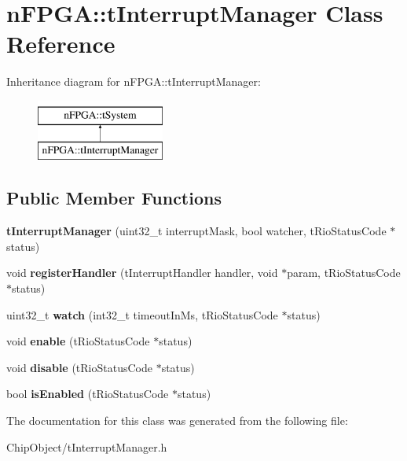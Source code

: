 \hypertarget{classnFPGA_1_1tInterruptManager}{
\section{nFPGA::tInterruptManager Class Reference}
\label{classnFPGA_1_1tInterruptManager}
}
Inheritance diagram for nFPGA::tInterruptManager:\begin{figure}[H]
\begin{center}
\leavevmode
\includegraphics[height=2.000000cm]{classnFPGA_1_1tInterruptManager}
\end{center}
\end{figure}
\subsection*{Public Member Functions}
\begin{DoxyCompactItemize}
\item 
\hypertarget{classnFPGA_1_1tInterruptManager_adf2f47bfd54901bc553d2a3d9f9ae1a7}{
{\bfseries tInterruptManager} (uint32\_\-t interruptMask, bool watcher, tRioStatusCode $\ast$status)}
\label{classnFPGA_1_1tInterruptManager_adf2f47bfd54901bc553d2a3d9f9ae1a7}

\item 
\hypertarget{classnFPGA_1_1tInterruptManager_a692db7281d9179bf3cfe10cd81f6b77b}{
void {\bfseries registerHandler} (tInterruptHandler handler, void $\ast$param, tRioStatusCode $\ast$status)}
\label{classnFPGA_1_1tInterruptManager_a692db7281d9179bf3cfe10cd81f6b77b}

\item 
\hypertarget{classnFPGA_1_1tInterruptManager_a7801ebc3f0fabfacf25d0c176c612528}{
uint32\_\-t {\bfseries watch} (int32\_\-t timeoutInMs, tRioStatusCode $\ast$status)}
\label{classnFPGA_1_1tInterruptManager_a7801ebc3f0fabfacf25d0c176c612528}

\item 
\hypertarget{classnFPGA_1_1tInterruptManager_a2893867e617cfe917653f9e1034d696d}{
void {\bfseries enable} (tRioStatusCode $\ast$status)}
\label{classnFPGA_1_1tInterruptManager_a2893867e617cfe917653f9e1034d696d}

\item 
\hypertarget{classnFPGA_1_1tInterruptManager_a5c3ea6c1f698c074baa02d09060aed8c}{
void {\bfseries disable} (tRioStatusCode $\ast$status)}
\label{classnFPGA_1_1tInterruptManager_a5c3ea6c1f698c074baa02d09060aed8c}

\item 
\hypertarget{classnFPGA_1_1tInterruptManager_afb1264c599d1292f833125993160c45d}{
bool {\bfseries isEnabled} (tRioStatusCode $\ast$status)}
\label{classnFPGA_1_1tInterruptManager_afb1264c599d1292f833125993160c45d}

\end{DoxyCompactItemize}


The documentation for this class was generated from the following file:\begin{DoxyCompactItemize}
\item 
ChipObject/tInterruptManager.h\end{DoxyCompactItemize}
